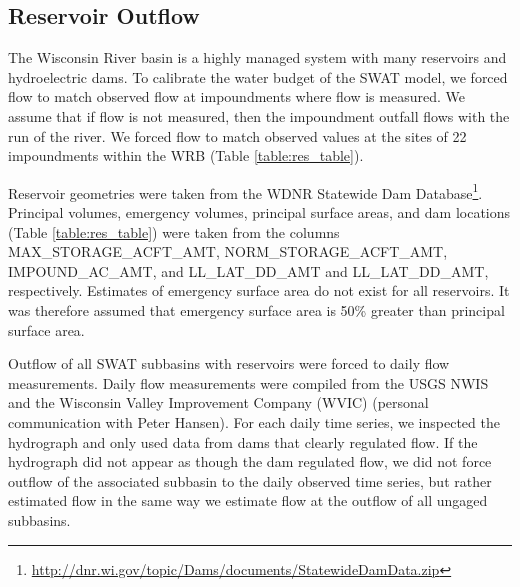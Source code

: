 \subsection{Reservoir Outflow}\label{sec:reservoirs}

The Wisconsin River basin is a highly managed system with many reservoirs and hydroelectric dams. To calibrate the water budget of the SWAT model, we forced flow to match observed flow at impoundments where flow is measured. We assume that if flow is not measured, then the impoundment outfall flows with the run of the river. We forced flow to match observed values at the sites of 22 impoundments within the WRB (Table \ref{table:res_table}).

Reservoir geometries were taken from the WDNR Statewide Dam Database\footnote{\url{http://dnr.wi.gov/topic/Dams/documents/StatewideDamData.zip}}. Principal volumes, emergency volumes, principal surface areas, and dam locations (Table \ref{table:res_table}) were taken from the columns MAX\_STORAGE\_ACFT\_AMT, NORM\_STORAGE\_ACFT\_AMT, IMPOUND\_AC\_AMT, and LL\_LAT\_DD\_AMT and LL\_LAT\_DD\_AMT, respectively. Estimates of emergency surface area do not exist for all reservoirs. It was therefore assumed that emergency surface area is 50\% greater than principal surface area.

Outflow of all SWAT subbasins with reservoirs were forced to daily flow measurements. Daily flow measurements were compiled from the USGS NWIS \citep{usgs_nwis_2014} and the Wisconsin Valley Improvement Company (WVIC) (personal communication with Peter Hansen). For each daily time series, we inspected the hydrograph and only used data from dams that clearly regulated flow. If the hydrograph did not appear as though the dam regulated flow, we did not force outflow of the associated subbasin to the daily observed time series, but rather estimated flow in the same way we estimate flow at the outflow of all ungaged subbasins. 
